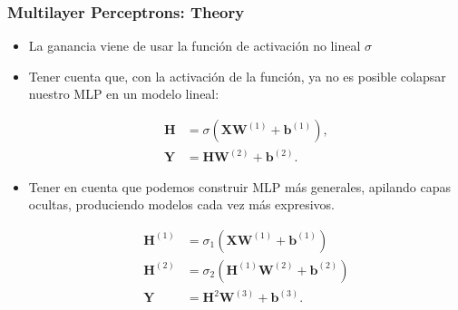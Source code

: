 \documentclass[
  shownotes,
  xcolor={svgnames},
  hyperref={colorlinks,citecolor=DarkBlue,linkcolor=DarkRed,urlcolor=DarkBlue}
  , aspectratio=169]{beamer}
\begin{document}
\begin{frame}
\frametitle{Multilayer Perceptrons: Theory}

\begin{itemize}
    \item La ganancia viene de usar la función de activación no lineal $\sigma$
    \item Tener cuenta que, con la activación de la función, ya no es posible colapsar nuestro MLP en un modelo lineal:

 \begin{align} 
 \mathbf{H} & = \sigma(\mathbf{X} \mathbf{W}^{(1)} + \mathbf{b}^{(1)}), \\ \nonumber
 \mathbf{Y} & = \mathbf{H}\mathbf{W}^{(2)} + \mathbf{b}^{(2)}.
 \end{align} 

\item Tener en cuenta que podemos construir MLP más generales, apilando capas ocultas, produciendo modelos cada vez más expresivos.

\begin{align}
\mathbf{H}^{(1)} &= \sigma_1(\mathbf{X} \mathbf{W}^{(1)} + \mathbf{b}^{(1)}) \\ \nonumber
\mathbf{H}^{(2)} &= \sigma_2(\mathbf{H}^{(1)} \mathbf{W}^{(2)} + \mathbf{b}^{(2)}) \\ \nonumber
\mathbf{Y} & = \mathbf{H}^{2}\mathbf{W}^{(3)} + \mathbf{b}^{(3)}.
\end{align}


\end{itemize}

\end{frame}
\end{document}
